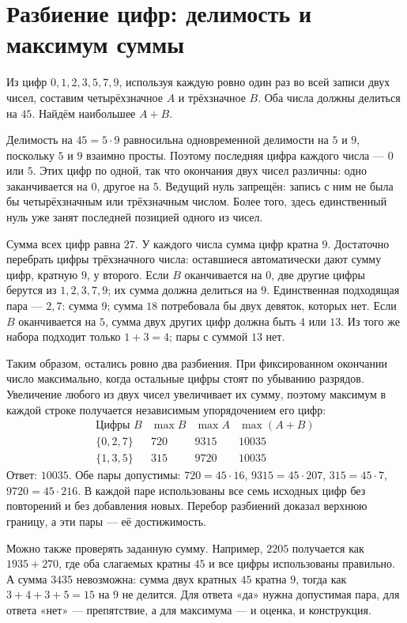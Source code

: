 \section{Разбиение цифр: делимость и максимум суммы}
\begin{example}\label{ex:review-ege-targeted-digits}
Из цифр \(0,1,2,3,5,7,9\), используя каждую ровно один раз во всей записи двух чисел, составим четырёхзначное \(A\) и трёхзначное \(B\). Оба числа должны делиться на \(45\). Найдём наибольшее \(A+B\).

Делимость на \(45=5\cdot9\) равносильна одновременной делимости на \(5\) и \(9\), поскольку \(5\) и \(9\) взаимно просты. Поэтому последняя цифра каждого числа --- \(0\) или \(5\). Этих цифр по одной, так что окончания двух чисел различны: одно заканчивается на \(0\), другое на \(5\). Ведущий нуль запрещён: запись с ним не была бы четырёхзначным или трёхзначным числом. Более того, здесь единственный нуль уже занят последней позицией одного из чисел.

Сумма всех цифр равна \(27\). У каждого числа сумма цифр кратна \(9\). Достаточно перебрать цифры трёхзначного числа: оставшиеся автоматически дают сумму цифр, кратную \(9\), у второго. Если \(B\) оканчивается на \(0\), две другие цифры берутся из \(1,2,3,7,9\); их сумма должна делиться на \(9\). Единственная подходящая пара --- \(2,7\): сумма \(9\); сумма \(18\) потребовала бы двух девяток, которых нет. Если \(B\) оканчивается на \(5\), сумма двух других цифр должна быть \(4\) или \(13\). Из того же набора подходит только \(1+3=4\); пары с суммой \(13\) нет.

Таким образом, остались ровно два разбиения. При фиксированном окончании число максимально, когда остальные цифры стоят по убыванию разрядов. Увеличение любого из двух чисел увеличивает их сумму, поэтому максимум в каждой строке получается независимым упорядочением его цифр:
\[
\begin{array}{c|c|c|c}
\text{Цифры }B&\max B&\max A&\max(A+B)\\\hline
\{0,2,7\}&720&9315&10035\\
\{1,3,5\}&315&9720&10035
\end{array}
\]
Ответ: \(10035\). Обе пары допустимы: \(720=45\cdot16\), \(9315=45\cdot207\), \(315=45\cdot7\), \(9720=45\cdot216\). В каждой паре использованы все семь исходных цифр без повторений и без добавления новых. Перебор разбиений доказал верхнюю границу, а эти пары --- её достижимость.

Можно также проверять заданную сумму. Например, \(2205\) получается как \(1935+270\), где оба слагаемых кратны \(45\) и все цифры использованы правильно. А сумма \(3435\) невозможна: сумма двух кратных \(45\) кратна \(9\), тогда как \(3+4+3+5=15\) на \(9\) не делится. Для ответа «да» нужна допустимая пара, для ответа «нет» --- препятствие, а для максимума --- и оценка, и конструкция.
\end{example}

